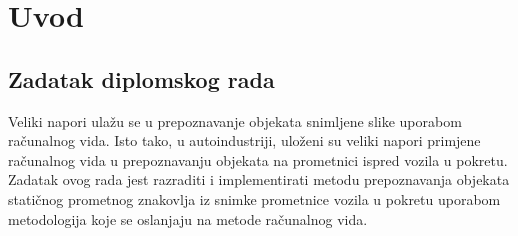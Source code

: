 \newpage

\setcounter{page}{1}
\setcounter{figure}{0}
\section{Uvod}%
\label{sec:Uvod}

\newpage
\subsection{Zadatak diplomskog rada} %
\label{sub:Zadatak diplomskog rada}
Veliki napori ulažu se u prepoznavanje objekata snimljene slike uporabom
računalnog vida. Isto tako, u autoindustriji, uloženi su veliki napori
primjene računalnog vida u prepoznavanju objekata na prometnici ispred
vozila u pokretu. Zadatak ovog rada jest razraditi i implementirati
metodu prepoznavanja objekata statičnog prometnog znakovlja iz snimke
prometnice vozila u pokretu uporabom metodologija koje se oslanjaju na
metode računalnog vida.

